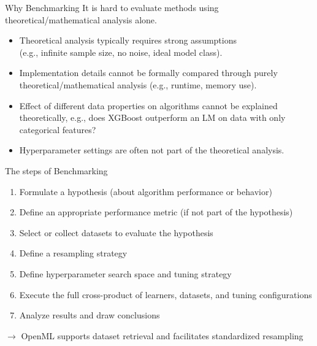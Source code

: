 \documentclass[11pt,compress,t,notes=noshow, xcolor=table]{beamer}
\date{}
\begin{document}


\begin{vbframe}{Why Benchmarking}
\vfill
It is hard to evaluate methods using theoretical/mathematical analysis alone.
\vfill
\begin{itemize}
    \item Theoretical analysis typically requires strong assumptions \\
    (e.g., infinite sample size, no noise, ideal model class).
    \item Implementation details cannot be formally compared through purely theoretical/mathematical analysis (e.g., runtime, memory use).
    \item Effect of different data properties on algorithms cannot be explained theoretically, e.g., does XGBoost outperform an LM on data with only categorical features?
    \item Hyperparameter settings are often not part of the theoretical analysis.
\end{itemize}
\vfill
\end{vbframe}

\begin{vbframe}{The steps of Benchmarking}
\vfill
\begin{enumerate}
    \item Formulate a hypothesis (about algorithm performance or behavior)
    \item Define an appropriate performance metric (if not part of the hypothesis)
    \item Select or collect datasets to evaluate the hypothesis
    \item Define a resampling strategy
    \item Define hyperparameter search space and tuning strategy
    \item Execute the full cross-product of learners, datasets, and tuning configurations
    \item Analyze results and draw conclusions
\end{enumerate}
\vfill
\pause
$\rightarrow$ OpenML supports dataset retrieval and facilitates standardized resampling
\end{vbframe}
\end{document}
